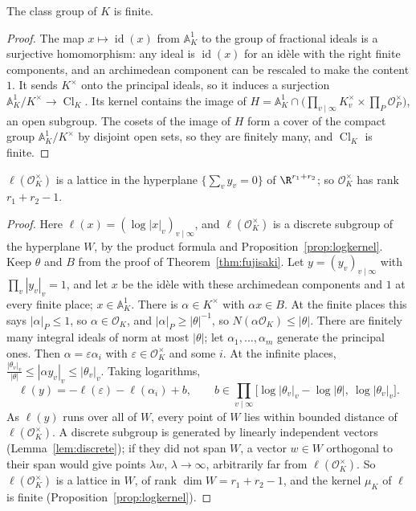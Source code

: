 \begin{corollary}\label{cor:hfinite}
The class group of $K$ is finite.
\end{corollary}
\begin{proof}
The map $x\mapsto\operatorname{id}(x)$ from $\mathbb{A}_K^1$ to the group of fractional ideals is a surjective homomorphism: any ideal is $\operatorname{id}(x)$ for an
id\`ele with the right finite components, and an archimedean component can be rescaled to make the content $1$. It sends $K^\times$ onto the principal
ideals, so it induces a surjection $\mathbb{A}_K^1/K^\times\to\operatorname{Cl}_K$. Its kernel contains the image of $H=\mathbb{A}_K^1\cap\bigl(\prod_{v\mid\infty}K_v^\times\times
\prod_P\mathcal O_P^\times\bigr)$, an open subgroup. The cosets of the image of $H$ form a cover of the compact group $\mathbb{A}_K^1/K^\times$ by disjoint open sets, so they
are finitely many, and $\operatorname{Cl}_K$ is finite.
\end{proof}

\begin{corollary}\label{cor:unitsagain}
$\ell(\mathcal O_K^\times)$ is a lattice in the hyperplane $\{\sum_vy_v=0\}$ of $\R^{r_1+r_2}$; so $\mathcal O_K^\times$ has rank $r_1+r_2-1$.
\end{corollary}
\begin{proof}
Here $\ell(x)=(\log|x|_v)_{v\mid\infty}$, and $\ell(\mathcal O_K^\times)$ is a discrete subgroup of the hyperplane $W$, by the product formula and
Proposition~\ref{prop:logkernel}. Keep $\theta$ and $B$ from the proof of Theorem~\ref{thm:fujisaki}. Let $y=(y_v)_{v\mid\infty}$ with $\prod_v|y_v|_v=1$, and
let $x$ be the id\`ele with these archimedean components and $1$ at every finite place; $x\in\mathbb{A}_K^1$. There is $\alpha\in K^\times$ with $\alpha x\in B$.
At the finite places this says $|\alpha|_P\le1$, so $\alpha\in\mathcal O_K$, and $|\alpha|_P\ge|\theta|^{-1}$, so $N(\alpha\mathcal O_K)\le|\theta|$. There are
finitely many integral ideals of norm at most $|\theta|$; let $\alpha_1,\dots,\alpha_m$ generate the principal ones. Then $\alpha=\varepsilon\alpha_i$ with
$\varepsilon\in\mathcal O_K^\times$ and some $i$. At the infinite places, $\frac{|\theta_v|_v}{|\theta|}\le|\alpha y_v|_v\le|\theta_v|_v$. Taking logarithms,
\[
\ell(y)=-\ell(\varepsilon)-\ell(\alpha_i)+b,\qquad b\in\prod_{v\mid\infty}\bigl[\log|\theta_v|_v-\log|\theta|,\ \log|\theta_v|_v\bigr].
\]
As $\ell(y)$ runs over all of $W$, every point of $W$ lies within bounded distance of $\ell(\mathcal O_K^\times)$. A discrete subgroup is generated by
linearly independent vectors (Lemma~\ref{lem:discrete}); if they did not span $W$, a vector $w\in W$ orthogonal to their span would give points $\lambda w$,
$\lambda\to\infty$, arbitrarily far from $\ell(\mathcal O_K^\times)$. So $\ell(\mathcal O_K^\times)$ is a lattice in $W$, of rank $\dim W=r_1+r_2-1$, and the kernel
$\mu_K$ of $\ell$ is finite (Proposition~\ref{prop:logkernel}).
\end{proof}


